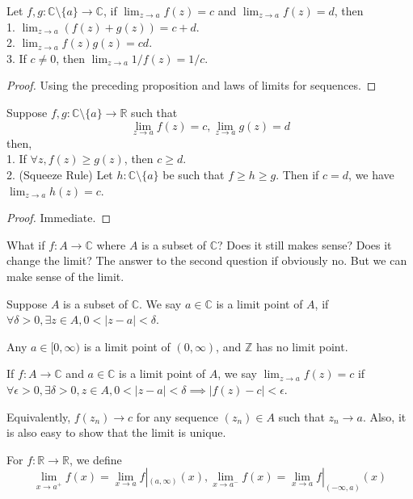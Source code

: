 \begin{proposition}
    Let $f,g:\mathbb C\setminus\{a\}\to\mathbb C$, if $\lim_{z\to a}f(z)=c$ and $\lim_{z\to a}f(z)=d$, then\\
    1. $\lim_{z\to a}(f(z)+g(z))=c+d$.\\
    2. $\lim_{z\to a}f(z)g(z)=cd$.\\
    3. If $c\neq 0$, then $\lim_{z\to a}1/f(z)=1/c$.
\end{proposition}
\begin{proof}
    Using the preceding proposition and laws of limits for sequences.
\end{proof}
\begin{proposition}
    Suppose $f,g:\mathbb C\setminus\{a\}\to\mathbb R$ such that
    $$\lim_{z\to a}f(z)=c,\lim_{z\to a}g(z)=d$$
    then,\\
    1. If $\forall z,f(z)\ge g(z)$, then $c\ge d$.\\
    2. (Squeeze Rule) Let $h:\mathbb C\setminus\{a\}$ be such that $f\ge h\ge g$.
    Then if $c=d$, we have $\lim_{z\to a}h(z)=c$.
\end{proposition}
\begin{proof}
    Immediate.
\end{proof}
What if $f:A\to\mathbb C$ where $A$ is a subset of $\mathbb C$?
Does it still makes sense?
Does it change the limit?
The answer to the second question if obviously no.
But we can make sense of the limit.
\begin{definition}
    Suppose $A$ is a subset of $\mathbb C$.
    We say $a\in\mathbb C$ is a limit point of $A$, if $\forall\delta>0,\exists z\in A,0<|z-a|<\delta$.
\end{definition}
\begin{example}
    Any $a\in [0,\infty)$ is a limit point of $(0,\infty)$, and $\mathbb Z$ has no limit point.
\end{example}
\begin{definition}
    If $f:A\to\mathbb C$ and $a\in\mathbb C$ is a limit point of $A$, we say $\lim_{z\to a}f(z)=c$ if $\forall\epsilon>0,\exists\delta>0,z\in A,0<|z-a|<\delta\implies |f(z)-c|<\epsilon$.
\end{definition}
Equivalently, $f(z_n)\to c$ for any sequence $(z_n)\in A$ such that $z_n\to a$.
Also, it is also easy to show that the limit is unique.
\begin{definition}
    For $f:\mathbb R\to\mathbb R$, we define
    $$\lim_{x\to a^+}f(x)=\lim_{x\to a}f|_{(a,\infty)}(x),\lim_{x\to a^-}f(x)=\lim_{x\to a}f|_{(-\infty,a)}(x)$$
\end{definition}
